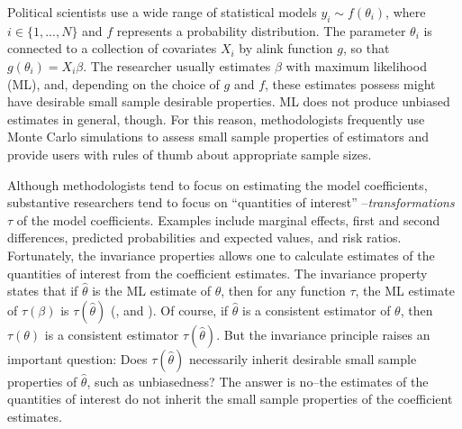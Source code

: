 \documentclass[12pt]{article}
\begin{document}
Political scientists use a wide range of statistical models $y_i \sim f(\theta_i)$, where $i \in \{1,..., N\}$ and $f$ represents a probability distribution. 
The parameter $\theta_i$ is connected to a collection of covariates $X_i$ by alink function $g$, so that $g(\theta_i) = X_i\beta$. 
The researcher usually estimates $\beta$ with maximum likelihood (ML), and, depending on the choice of $g$ and $f$, these estimates possess might have desirable small sample desirable properties. 
ML does not produce unbiased estimates in general, though. 
For this reason, methodologists frequently use Monte Carlo simulations to assess small sample properties of estimators and provide users with rules of thumb about appropriate sample sizes.

Although methodologists tend to focus on estimating the model coefficients, substantive researchers tend to focus on ``quantities of interest'' \citep{KingTomzWittenberg2000}--\textit{transformations} $\tau$ of the model coefficients. 
Examples include marginal effects, first and second differences, predicted probabilities and expected values, and risk ratios. 
Fortunately, the invariance properties allows one to calculate estimates of the quantities of interest from the coefficient estimates.
The invariance property states that if $\hat{\theta}$ is the ML estimate of $\theta$, then for any function $\tau$, the ML estimate of $\tau(\beta)$ is $\tau(\hat{\theta})$ (\citealt[pp. 75-76]{King1989}, and \citealt[pp. 320-321]{CasellaBerger2002}). %
Of course, if $\hat{\theta}$ is a consistent estimator of $\theta$, then $\tau(\theta)$ is a consistent estimator $\tau(\hat{\theta})$. But the invariance principle raises an important question: Does $\tau(\hat{\theta})$ necessarily inherit desirable small sample properties of $\hat{\theta}$, such as unbiasedness? The answer is no--the estimates of the quantities of interest do not inherit the small sample properties of the coefficient estimates. 
\end{document}
